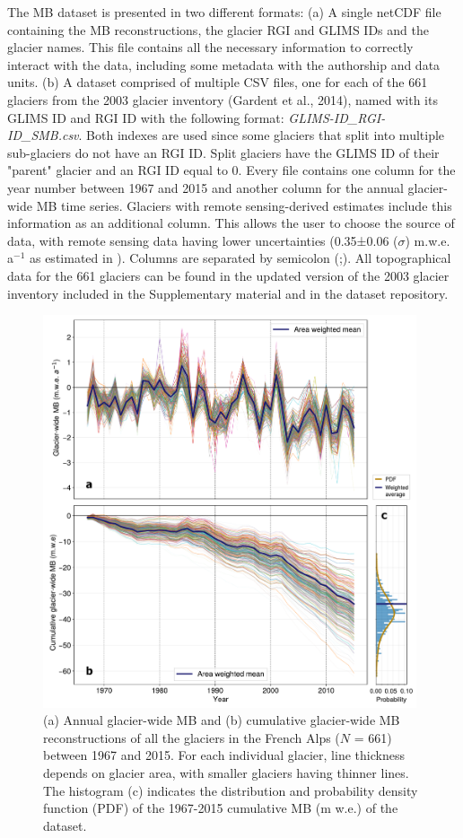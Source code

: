 {The MB dataset is presented in two different formats: (a) A single netCDF file containing the MB reconstructions, the glacier RGI and GLIMS IDs and the glacier names. This file contains all the necessary information to correctly interact with the data, including some metadata with the authorship and data units. (b) A dataset comprised of multiple CSV files, one for each of the 661 glaciers from the 2003 glacier inventory (Gardent et al., 2014), named with its GLIMS ID and RGI ID with the following format: \textit{ GLIMS-ID\_RGI-ID\_SMB.csv}. Both indexes are used since some glaciers that split into multiple sub-glaciers do not have an RGI ID. Split glaciers have the GLIMS ID of their "parent" glacier and an RGI ID equal to 0. Every file contains one column for the year number between 1967 and 2015 and another column for the annual glacier-wide MB time series. Glaciers with remote sensing-derived estimates \citep{rabatel_spatio-temporal_2016} include this information as an additional column. This allows the user to choose the source of data, with remote sensing data having lower uncertainties (0.35±0.06 ($\sigma$) m.w.e. a$^{-1}$ as estimated in \citet{rabatel_spatio-temporal_2016}). Columns are separated by semicolon (;). All topographical data for the 661 glaciers can be found in the updated version of the 2003 glacier inventory included in the Supplementary material and in the dataset repository. 

\begin{figure}[t]
\centering
\includegraphics[width=11cm]{Figures/past/Figure_3.pdf}
\captionsetup{justification=centering}
\caption{(a) Annual glacier-wide MB and (b) cumulative glacier-wide MB reconstructions of all the glaciers in the French Alps ($N$ = 661) between 1967 and 2015. For each individual glacier, line thickness depends on glacier area, with smaller glaciers having thinner lines. The histogram (c) indicates the distribution and probability density function (PDF) of the 1967-2015 cumulative MB (m w.e.) of the dataset.}
\label{past:fig3}
\end{figure}

}
